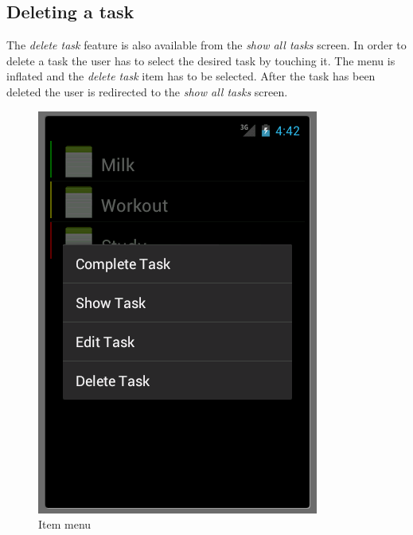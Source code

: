 \subsection{Deleting a task}
The \emph{delete task} feature is also available from the \emph{show all tasks}
screen. In order to delete a task the user has to select the desired task by
touching it. The menu is inflated and the \emph{delete task} item has to be
selected. After the task has been deleted the user is redirected to the
\emph{show all tasks} screen.
 \begin{figure}[h]
  \caption{Item menu}
  \label{itemMenu}
  \center
  	\includegraphics[scale=0.25]{../resources/item-menu.png}
\end{figure}


